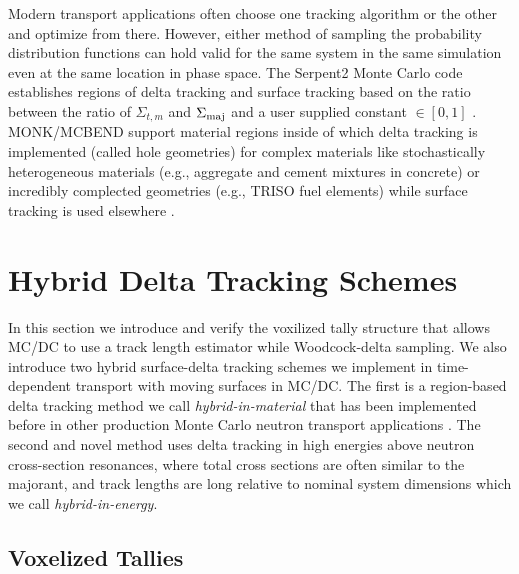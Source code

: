 Modern transport applications often choose one tracking algorithm or the other and optimize from there.
However, either method of sampling the probability distribution functions can hold valid for the same system in the same simulation even at the same location in phase space.
The Serpent2 Monte Carlo code establishes regions of delta tracking and surface tracking based on the ratio between the ratio of $\Sigma_{t,m}$ and $\Sigma_{\text{maj}}$ and a user supplied constant $\in [0,1]$ \cite{leppanen_development_2013}.
MONK/MCBEND support material regions inside of which delta tracking is implemented (called hole geometries) for complex materials like stochastically heterogeneous materials (e.g., aggregate and cement mixtures in concrete) or incredibly complected geometries (e.g., TRISO fuel elements) while surface tracking is used elsewhere \cite{richards_monk_2015, richards_monk_2025}.


\section{Hybrid Delta Tracking Schemes}

In this section we introduce and verify the voxilized tally structure that allows MC/DC to use a track length estimator while Woodcock-delta sampling.
We also introduce two hybrid surface-delta tracking schemes we implement in time-dependent transport with moving surfaces in MC/DC.
The first is a region-based delta tracking method we call \emph{hybrid-in-material} that has been implemented before in other production Monte Carlo neutron transport applications \cite{fang_development_2022, leppanen_development_2013}.
The second and novel method uses delta tracking in high energies above neutron cross-section resonances, where total cross sections are often similar to the majorant, and track lengths are long relative to nominal system dimensions which we call \emph{hybrid-in-energy}.


\subsection{Voxelized Tallies}
\label{sec:voxtallies}

